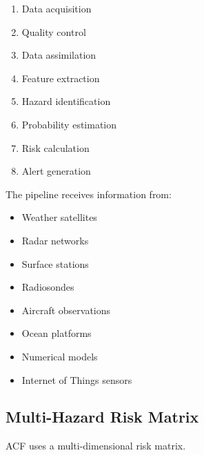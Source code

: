 \begin{enumerate}

\item Data acquisition

\item Quality control

\item Data assimilation

\item Feature extraction

\item Hazard identification

\item Probability estimation

\item Risk calculation

\item Alert generation

\end{enumerate}


The pipeline receives information from:

\begin{itemize}

\item Weather satellites

\item Radar networks

\item Surface stations

\item Radiosondes

\item Aircraft observations

\item Ocean platforms

\item Numerical models

\item Internet of Things sensors

\end{itemize}


\subsection{Multi-Hazard Risk Matrix}

ACF uses a multi-dimensional risk matrix.


